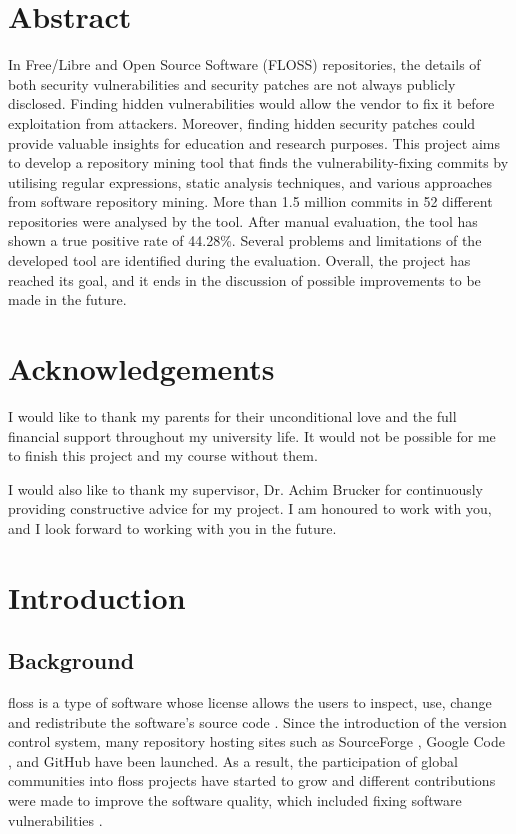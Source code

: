 \documentclass[12pt, a4paper]{report}
\begin{document}
\newpage

\chapter*{Abstract}
In Free/Libre and Open Source Software (FLOSS) repositories, the details of both security
vulnerabilities and security patches are not always publicly disclosed. Finding hidden
vulnerabilities would allow the vendor to fix it before exploitation from attackers. Moreover,
finding hidden security patches could provide valuable insights for education and research purposes.
This project aims to develop a repository mining tool that finds the vulnerability-fixing commits by
utilising regular expressions, static analysis techniques, and various approaches from software
repository mining. More than 1.5 million commits in 52 different repositories were analysed by the
tool. After manual evaluation, the tool has shown a true positive rate of 44.28\%. Several problems
and limitations of the developed tool are identified during the evaluation. Overall, the project has
reached its goal, and it ends in the discussion of possible improvements to be made in the future.

\chapter*{Acknowledgements}
I would like to thank my parents for their unconditional love and the full financial support
throughout my university life. It would not be possible for me to finish this project and my course
without them.

I would also like to thank my supervisor, Dr. Achim Brucker for continuously providing constructive
advice for my project. I am honoured to work with you, and I look forward to working with you in the
future.

\newpage

\tableofcontents

\listoffigures

\listoftables

\lstlistoflistings

\newpage


\chapter{Introduction}
\section{Background}
\acrfull{floss} is a type of software whose license allows the users to inspect, use, change and
redistribute the software's source code \cite{crowston_2012}. Since the introduction of the version
control system, many repository hosting sites such as SourceForge \cite{sourceforge}, Google Code
\cite{google_code}, and GitHub \cite{github} have been launched. As a result, the participation of
global communities into \acrshort{floss} projects have started to grow and different contributions
were made to improve the software quality, which included fixing software vulnerabilities
\cite{dabbish_2012}.
\end{document}
